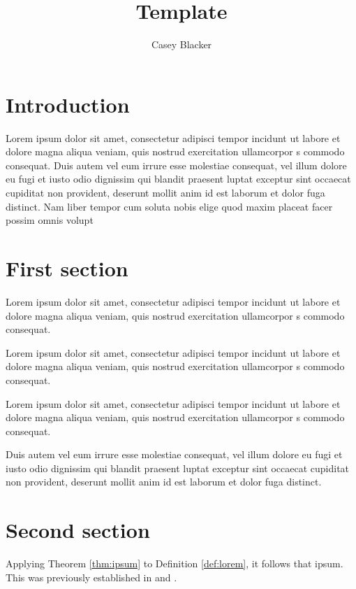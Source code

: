 \documentclass{article}
\title{Template}
\author{Casey Blacker}\date{}
\begin{document}
\maketitle



\section*{Introduction}
Lorem ipsum dolor sit amet, consectetur adipisci tempor incidunt ut labore et dolore magna aliqua veniam, quis nostrud exercitation ullamcorpor s commodo consequat. Duis autem vel eum irrure esse molestiae consequat, vel illum dolore eu fugi et iusto odio dignissim qui blandit praesent luptat exceptur sint occaecat cupiditat non provident, deserunt mollit anim id est laborum et dolor fuga distinct. Nam liber tempor cum soluta nobis elige quod maxim placeat facer possim omnis volupt


\section{First section}

Lorem ipsum dolor sit amet, consectetur adipisci tempor incidunt ut labore et dolore magna aliqua veniam, quis nostrud exercitation ullamcorpor s commodo consequat. 

\begin{definition}\label{def:lorem}
	Lorem ipsum dolor sit amet, consectetur adipisci tempor incidunt ut labore et dolore magna aliqua veniam, quis nostrud exercitation ullamcorpor s commodo consequat.
\end{definition}

Lorem ipsum dolor sit amet, consectetur adipisci tempor incidunt ut labore et dolore magna aliqua veniam, quis nostrud exercitation ullamcorpor s commodo consequat. 

\begin{theorem}\label{thm:ipsum}
	Duis autem vel eum irrure esse molestiae consequat, vel illum dolore eu fugi et iusto odio dignissim qui blandit praesent luptat exceptur sint occaecat cupiditat non provident, deserunt mollit anim id est laborum et dolor fuga distinct.
\end{theorem}



\section{Second section}

Applying Theorem \ref{thm:ipsum} to Definition \ref{def:lorem}, it follows that ipsum. This was previously established in \cite{Gauss86} and \cite{Euclid02,Euclid03}.






\end{document}
